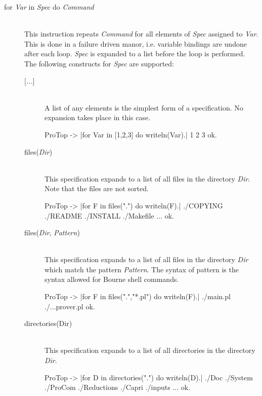 \begin{description}
  \item [for {\em Var}\/ in {\em Spec}\/ do {\em Command}]\ 
    \\
    This instruction repeats {\em Command}\/ for all elements of {\em Spec}\/
    assigned to {\em Var}. This is done in a failure driven manor, i.e.
    variable bindings are undone after each loop. {\em Spec}\/ is expanded to
    a list before the loop is performed. The following constructs for {\em
      Spec}\/ are supported:
  \begin{description}
    \item [{[{\em ...}]}]\ \\
    A list of any elements is the simplest form of a specification. No
    expansion takes place in this case.
    \begin{BoxedSample}
ProTop -> |for Var in [1,2,3] do writeln(Var).|
1
2
3
ok.
    \end{BoxedSample}

    \item [files({\em Dir})]\ 
      \\
      This specification expands to a list of all files in the directory {\em
        Dir}. Note that the files are not sorted.
\begin{BoxedSample}
  ProTop -> |for F in files(".") do writeln(F).|
  ./COPYING
  ./README
  ./INSTALL
  ./Makefile
  ...
  ok.
\end{BoxedSample}

    \item [files({\em Dir}, {\em Pattern})]\ 
      \\
      This specification expands to a list of all files in the directory {\em
        Dir} which match the pattern {\em Pattern}. The syntax of pattern is
      the syntax allowed for Bourne shell commands.
\begin{BoxedSample}
  ProTop -> |for F in files(".","*.pl") do writeln(F).|
  ./main.pl
  ./...prover.pl
  ok.
\end{BoxedSample}

    \item [directories(Dir)]\ 
      \\
      This specification expands to a list of all directories in the directory
      {\em Dir}.
\begin{BoxedSample}
  ProTop -> |for D in directories(".") do writeln(D).|
  ./Doc
  ./System
  ./ProCom
  ./Reductions
  ./Capri
  ./inputs
  ...
  ok.
\end{BoxedSample}


\end{description}
\end{description}
